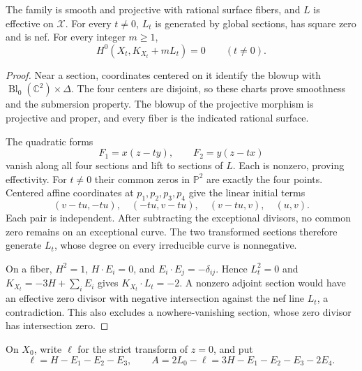 \begin{lemma}\label{lem:four-point-family-adjoint-vanishing}
The family is smooth and projective with rational surface fibers, and $L$ is effective on $\mathcal X$. For every $t\ne0$, $L_t$ is generated by global sections, has square zero and is nef. For every integer $m\geq1$,
\[
 H^0(X_t,K_{X_t}+mL_t)=0\qquad(t\ne0).
\]
\end{lemma}
\begin{proof}
Near a section, coordinates centered on it identify the blowup with $\operatorname{Bl}_0(\mathbb C^2)\times\Delta$. The four centers are disjoint, so these charts prove smoothness and the submersion property. The blowup of the projective morphism is projective and proper, and every fiber is the indicated rational surface.

The quadratic forms
\[
 F_1=x(z-ty),\qquad F_2=y(z-tx)
\]
vanish along all four sections and lift to sections of $L$. Each is nonzero, proving effectivity. For $t\ne0$ their common zeros in $\mathbb P^2$ are exactly the four points. Centered affine coordinates at $p_1,p_2,p_3,p_4$ give the linear initial terms
\[
 (v-tu,-tu),\quad(-tu,v-tu),\quad(v-tu,v),\quad(u,v).
\]
Each pair is independent. After subtracting the exceptional divisors, no common zero remains on an exceptional curve. The two transformed sections therefore generate $L_t$, whose degree on every irreducible curve is nonnegative.

On a fiber, $H^2=1$, $H\cdot E_i=0$, and $E_i\cdot E_j=-\delta_{ij}$. Hence $L_t^2=0$ and $K_{X_t}=-3H+\sum_iE_i$ gives $K_{X_t}\cdot L_t=-2$. A nonzero adjoint section would have an effective zero divisor with negative intersection against the nef line $L_t$, a contradiction. This also excludes a nowhere-vanishing section, whose zero divisor has intersection zero.
\end{proof}

On $X_0$, write $\ell$ for the strict transform of $z=0$, and put
\[
 \ell=H-E_1-E_2-E_3,\qquad
 A=2L_0-\ell=3H-E_1-E_2-E_3-2E_4.
\]

